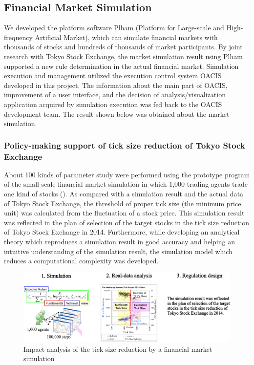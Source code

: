 \subsection{Financial Market Simulation}
\label{ss:Market Simulation}

We developed the platform software Plham (Platform for Large-scale and
High-frequency Artificial Market), which can simulate financial
markets with thousands of stocks and hundreds of thousands of market
participants\cite{ToriiIzumiYamada2017}.  By joint research with Tokyo
Stock Exchange, the market simulation result using Plham supported a
new rule determination in the actual financial market.  Simulation
execution and management utilized the execution control system OACIS
developed in this project.  The information about the main part of
OACIS, improvement of a user interface, and the decision of
analysis/visualization application acquired by simulation execution
was fed back to the OACIS development team.  The result shown below
was obtained about the market simulation.

\subsubsection{Policy-making support of tick size reduction of Tokyo Stock Exchange}

About 100 kinds of parameter study were performed using the prototype
program of the small-scale financial market simulation in which 1,000
trading agents trade one kind of stocks
()\cite{Mizuta2013a,doi:10.1002/isaf.1374,MizutaKosugiKusumotoMatsumotoIzumi2015}.
As compared with a simulation result and the actual data of Tokyo
Stock Exchange, the threshold of proper tick size (the minimum price
unit) was calculated from the fluctuation of a stock price.  This
simulation result was reflected in the plan of selection of the target
stocks in the tick size reduction of Tokyo Stock Exchange in 2014.
Furthermore, while developing an analytical theory which reproduces a
simulation result in good accuracy and helping an intuitive
understanding of the simulation result, the simulation model which
reduces a computational complexity was developed.

\begin{figure}[htb]
  \centering
  \includegraphics[width=.8\linewidth]{Figs.izumi/TickSize.eps}
  \caption{Impact analysis of the tick size reduction by a financial market simulation}
  \label{fig:Figs.izumi/ticksize.eps}
\end{figure}

